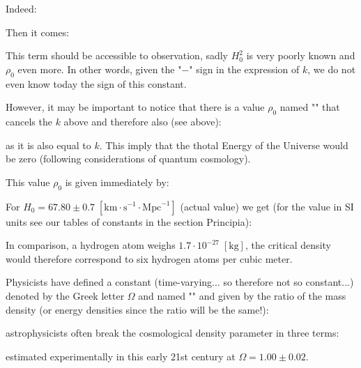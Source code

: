 	Indeed:
	
	Then it comes:
	
	This term should be accessible to observation, sadly $H_0^2$ is very poorly known and $\rho_0$ even more. In other words, given the "$-$" sign in the expression of $k$, we do not even know today the sign of this constant.
	
	However, it may be important to notice that there is a value $\rho_0$ named "" that cancels the $k$ above and therefore also (see above):
	
	as it is also equal to $k$. This imply that the thotal Energy of the Universe would be zero (following considerations of quantum cosmology).

	This value $\rho_0$ is given immediately by:
	
	For $H_0=67.80\pm 0.7\;[\text{km} \cdot\text{s}^{-1}\cdot\text{Mpc}^{-1}]$ (actual value) we get (for the value in SI units see our tables of constants in the section Principia):
	
	In comparison, a hydrogen atom weighs $1.7\cdot 10^{-27}\;[\text{kg}]$, the critical density would therefore correspond to six hydrogen atoms per cubic meter.

	Physicists have defined a constant (time-varying... so therefore not so constant...) denoted by the Greek letter $\Omega$ and named "" and given by the ratio of the mass density (or energy densities since the ratio will be the same!):
	
	astrophysicists often break the cosmological density parameter in three terms:
	
	estimated  experimentally in this early 21st century at $\Omega=1.00\pm0.02$.
	
